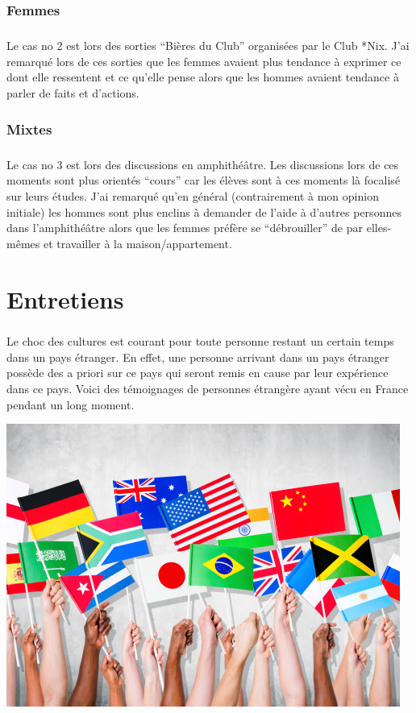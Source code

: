 \subsection{Femmes}
\paragraph{}
Le cas no 2 est lors des sorties “Bières du Club” organisées par le Club *Nix.
J’ai remarqué lors de ces sorties que les femmes avaient plus tendance à exprimer
ce dont elle ressentent et ce qu’elle pense alors que les hommes avaient tendance
à parler de faits et d’actions.

\subsection{Mixtes}
\paragraph{}
Le cas no 3 est lors des discussions en amphithéâtre. Les discussions lors de
ces moments sont plus orientés “cours” car les élèves sont à ces moments là
focalisé sur leurs études. J’ai remarqué qu’en général (contrairement à mon
opinion initiale) les hommes sont plus enclins à demander de l’aide à d’autres personnes dans l’amphithéâtre alors que les femmes préfère se “débrouiller” de
par elles-mêmes et travailler à la maison/appartement.

\chapter{Entretiens}
\paragraph{}
Le choc des cultures est courant pour toute personne restant un certain temps dans un pays étranger. En effet, une personne arrivant dans un pays étranger possède des a priori sur ce pays qui seront remis en cause par leur expérience dans ce pays. Voici des témoignages de personnes étrangère ayant vécu en France pendant un long moment. 
\begin{center}
\includegraphics[scale=0.5]{entretien.jpg}
\end{center}

